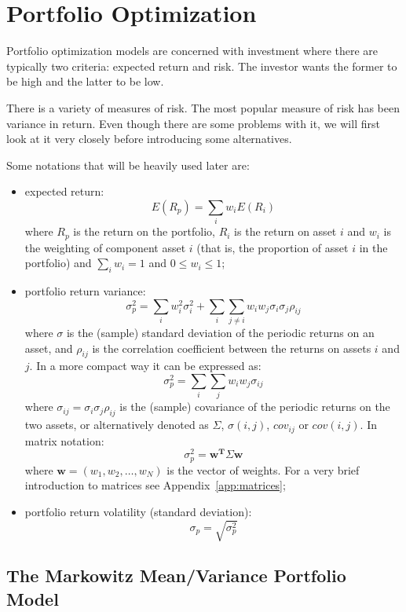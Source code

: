 \chapter{Portfolio Optimization}\label{portfolio-optimization}

Portfolio optimization models are concerned with investment where there
are typically two criteria: expected return and risk.
The investor wants
the former to be high and the latter to be low. 

There is a variety of
measures of risk. The most popular measure of risk has been variance in
return. Even though there are some problems with it, we will first look
at it very closely before introducing some alternatives.

Some notations that will be heavily used later are:

\begin{itemize}
\tightlist
\item
  expected return: \[ E(R_{p}) = \sum _{i}w_{i} E(R_{i}) \] where
  \(R_{p}\) is the return on the portfolio, \(R_{i}\) is the return on
  asset \(i\) and \(w_{i}\) is the weighting of component asset \(i\)
  (that is, the proportion of asset \(i\) in the portfolio) and
  \(\sum_{i}w_i = 1\) and \(0 \le w_i \le 1\);
\item
  portfolio return variance:
  \[ \sigma _{p}^{2} = \sum _{i}w_{i}^{2}\sigma _{i}^{2} + \sum _{i}\sum _{j\neq i}w_{i}w_{j}\sigma _{i}\sigma _{j}\rho _{ij} \]
  where \(\sigma\) is the (sample) standard deviation of the periodic
  returns on an asset, and \(\rho _{ij}\) is the correlation coefficient
  between the returns on assets \(i\) and \(j\). In a more compact way
  it can be expressed as:
  \[ \sigma _{p}^{2}=\sum _{i}\sum _{j}w_{i}w_{j}\sigma _{ij} \] where
  \(\sigma _{ij}=\sigma _{i}\sigma _{j}\rho _{ij}\) is the (sample)
  covariance of the periodic returns on the two assets, or alternatively
  denoted as \(\Sigma\), \(\sigma (i,j)\), \(cov_{ij}\) or \(cov(i,j)\).
  In matrix notation:
  \[\sigma_p^2 = \mathbf{w^T}\Sigma\mathbf{w} \]
  where $\mathbf{w} = (w_1,w_2,\ldots,w_N)$ is the vector of weights. For a very brief introduction
  to matrices see Appendix~\ref{app:matrices};
\item
  portfolio return volatility (standard deviation):
  \[ \sigma _{p}= \sqrt{\sigma _{p}^{2}}\]
\end{itemize}

\section{The Markowitz Mean/Variance Portfolio
Model}\label{the-markowitz-meanvariance-portfolio-model}

